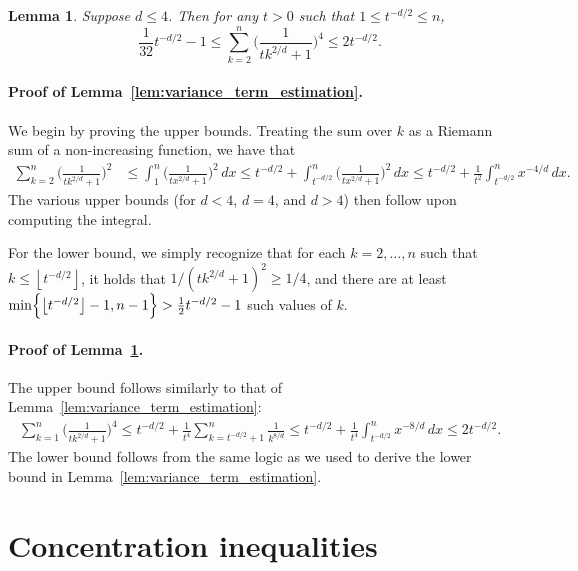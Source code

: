 \documentclass[twoside]{article}
\newcommand{\floor}[1]{\left\lfloor #1 \right\rfloor}
\newcommand{\1}{\mathbf{1}}
\newtheorem{lemma}{Lemma}
\theoremstyle{definition}
\theoremstyle{remark}
\begin{document}
\begin{lemma}
	\label{lem:variance_term_testing}
	Suppose $d \leq 4$. Then for any $t > 0$ such that $1 \leq t^{-d/2} \leq n$,
	\begin{equation*}
	\frac{1}{32}t^{-d/2} - 1 \leq \sum_{k = 2}^{n} \biggl(\frac{1}{tk^{2/d} + 1}\biggr)^4 \leq 2t^{-d/2}.
	\end{equation*}
\end{lemma}

\paragraph{Proof of Lemma~\ref{lem:variance_term_estimation}.}
We begin by proving the upper bounds. Treating the sum over $k$ as a Riemann sum of a non-increasing function, we have that
\begin{align*}
\sum_{k = 2}^{n} \biggl(\frac{1}{tk^{2/d} + 1}\biggr)^2 & \leq \int_{1}^{n} \biggl(\frac{1}{tx^{2/d} + 1}\biggr)^2 \,dx \leq t^{-d/2} + \int_{t^{-d/2}}^{n} \biggl(\frac{1}{tx^{2/d} + 1}\biggr)^2 \,dx \leq t^{-d/2} + \frac{1}{t^2} \int_{t^{-d/2}}^{n} x^{-4/d} \,dx.
\end{align*}
The various upper bounds (for $d < 4$, $d = 4$, and $d > 4$) then follow upon computing the integral.

For the lower bound, we simply recognize that for each $k = 2,\ldots,n$ such that $k \leq \floor{t^{-d/2}}$, it holds that $1/(tk^{2/d} + 1)^2 \geq 1/4$, and there are at least $\min\Bigl\{\floor{t^{-d/2}} - 1,n - 1\Bigr\} > \frac{1}{2}t^{-d/2} - 1$ such values of $k$.

\paragraph{Proof of Lemma~\ref{lem:variance_term_testing}.}
The upper bound follows similarly to that of Lemma~\ref{lem:variance_term_estimation}:
\begin{align*}
\sum_{k = 1}^{n} \biggl(\frac{1}{tk^{2/d} + 1}\biggr)^4 \leq t^{-d/2} + \frac{1}{t^4}\sum_{k = t^{-d/2} + 1}^{n} \frac{1}{k^{8/d}} \leq t^{-d/2} + \frac{1}{t^4} \int_{t^{-d/2}}^{n} x^{-8/d} \,dx \leq 2t^{-d/2}.
\end{align*}
The lower bound follows from the same logic as we used to derive the lower bound in Lemma~\ref{lem:variance_term_estimation}.

\section{Concentration inequalities}
\end{document}
